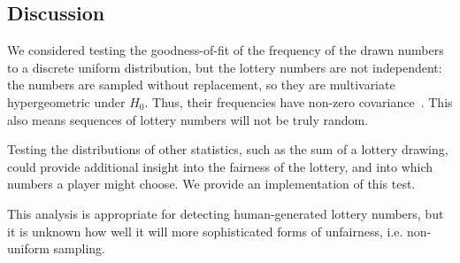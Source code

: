 \subsection{Discussion}

We considered testing the goodness-of-fit of the frequency of the drawn numbers to a discrete uniform distribution, but the lottery numbers
are not independent: the numbers are sampled without replacement,
so they are multivariate hypergeometric under $H_0$. Thus, their frequencies have non-zero covariance~\cite{siegrist}. This also means sequences of lottery numbers will not be truly random.

Testing the distributions of other statistics, such as the sum of a lottery drawing, could provide additional insight into the fairness of the lottery, and into which numbers a player might choose. We provide an implementation of this test.

This analysis is appropriate for detecting human-generated lottery 
numbers, but it is unknown how well it will more sophisticated forms of unfairness, i.e. non-uniform sampling.